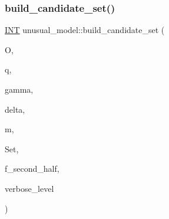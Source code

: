 \subsubsection{\texorpdfstring{build\+\_\+candidate\+\_\+set()}{build\_candidate\_set()}}
{\footnotesize\ttfamily \mbox{\hyperlink{galois_8h_a09fddde158a3a20bd2dcadb609de11dc}{I\+NT}} unusual\+\_\+model\+::build\+\_\+candidate\+\_\+set (\begin{DoxyParamCaption}\item[{\mbox{\hyperlink{classorthogonal}{orthogonal}} \&}]{O,  }\item[{\mbox{\hyperlink{galois_8h_a09fddde158a3a20bd2dcadb609de11dc}{I\+NT}}}]{q,  }\item[{\mbox{\hyperlink{galois_8h_a09fddde158a3a20bd2dcadb609de11dc}{I\+NT}}}]{gamma,  }\item[{\mbox{\hyperlink{galois_8h_a09fddde158a3a20bd2dcadb609de11dc}{I\+NT}}}]{delta,  }\item[{\mbox{\hyperlink{galois_8h_a09fddde158a3a20bd2dcadb609de11dc}{I\+NT}}}]{m,  }\item[{\mbox{\hyperlink{galois_8h_a09fddde158a3a20bd2dcadb609de11dc}{I\+NT}} $\ast$}]{Set,  }\item[{\mbox{\hyperlink{galois_8h_a09fddde158a3a20bd2dcadb609de11dc}{I\+NT}}}]{f\+\_\+second\+\_\+half,  }\item[{\mbox{\hyperlink{galois_8h_a09fddde158a3a20bd2dcadb609de11dc}{I\+NT}}}]{verbose\+\_\+level }\end{DoxyParamCaption})}

\mbox{\label{classunusual__model_a6ee77ff219ebcae7e1bccd23cf209d22}} 
